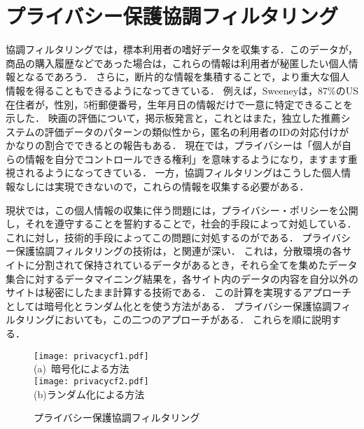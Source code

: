 \chapter{プライバシー保護協調フィルタリング}
\label{chap:privacy}

協調フィルタリングでは，標本利用者の嗜好データを収集する．このデータが，商品の購入履歴などであった場合は，これらの情報は利用者が秘匿したい個人情報となるであろう．
さらに，断片的な情報を集積することで，より重大な個人情報を得ることもできるようになってきている．
例えば，Sweeneyは，87\%のUS在住者が，性別，5桁郵便番号，生年月日の情報だけで一意に特定できることを示した\cite{misc:079}．
映画の評価について，掲示板発言と，これとはまた，独立した推薦システムの評価データのパターンの類似性から，匿名の利用者のIDの対応付けがかなりの割合でできるとの報告もある\cite{sigir:06:05}．
現在では，プライバシーは「個人が自らの情報を自分でコントロールできる権利」\cite{jjsai:06:05}を意味するようになり，ますます重視されるようになってきている．
一方，協調フィルタリングはこうした個人情報なしには実現できないので，これらの情報を収集する必要がある．

現状では，この個人情報の収集に伴う問題には，プライバシー・ポリシーを公開し，それを遵守することを誓約することで，社会的手段によって対処している．
これに対し，技術的手段によってこの問題に対処するのがである．
プライバシー保護協調フィルタリングの技術は，\cite{eb:056:00,jjsai:09:01}と関連が深い．
これは，分散環境の各サイトに分割されて保持されているデータがあるとき，それら全てを集めたデータ集合に対するデータマイニング結果を，各サイト内のデータの内容を自分以外のサイトは秘密にしたまま計算する技術である．
この計算を実現するアプローチとしては暗号化\cite{lncs:00:04}とランダム化\cite{sigmod:00:03}とを使う方法がある．
プライバシー保護協調フィルタリングにおいても，この二つのアプローチがある．
これらを順に説明する．


\begin{figure}
\centering
\texttt{[image: privacycf1.pdf]}\\\smallskip
(a)~暗号化による方法\\\bigskip
\texttt{[image: privacycf2.pdf]}\\\smallskip
(b)ランダム化による方法
\caption{プライバシー保護協調フィルタリング}
\label{fig:privacycf}
\end{figure}


